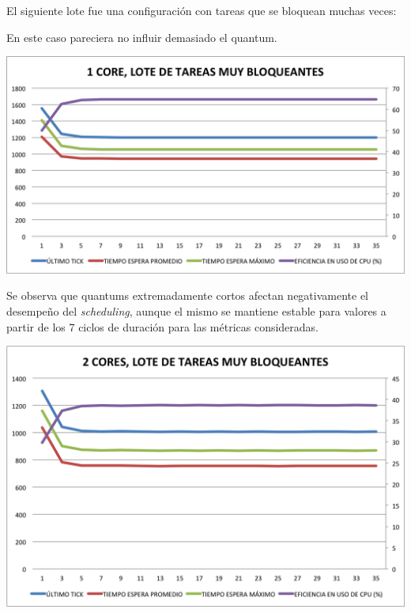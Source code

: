 El siguiente lote fue una configuraci\'on con tareas que se bloquean muchas veces:



En este caso pareciera no influir demasiado el quantum. \\

\begin{center}
	\includegraphics[scale=0.4]{graficos/1core_loteMuyBloqueante.png} \\
\end{center}

Se observa que quantums extremadamente cortos afectan negativamente el desempeño del \textit{scheduling}, aunque el mismo se mantiene estable para valores a partir de los 7 ciclos de duraci\'on para las m\'etricas consideradas. 

\begin{center}
	\includegraphics[scale=0.4]{graficos/2cores_loteMuyBloqueante.png} \\
\end{center}

